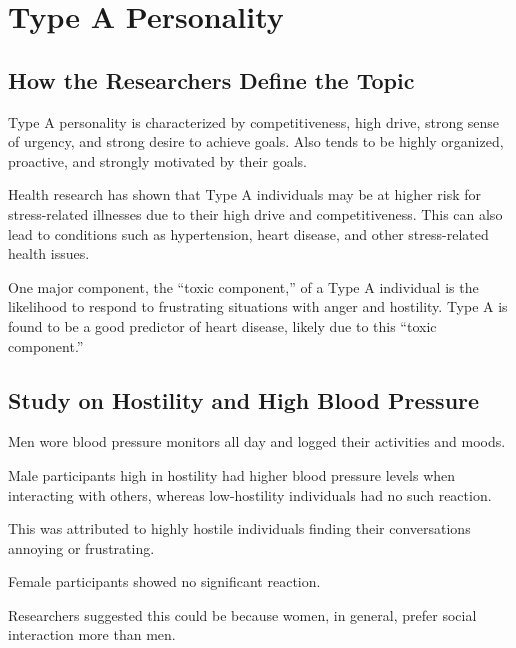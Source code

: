 \section{Type A Personality}  
\subsection{How the Researchers Define the Topic}  
\begin{coloredlist}  
    \item Type A personality is characterized by competitiveness, high drive, strong sense of urgency, and strong desire to achieve goals. Also tends to be highly organized, proactive, and strongly motivated by their goals.  
    \item Health research has shown that Type A individuals may be at higher risk for stress-related illnesses due to their high drive and competitiveness. This can also lead to conditions such as hypertension, heart disease, and other stress-related health issues.  
\end{coloredlist}  

One major component, the “toxic component,” of a Type A individual is the likelihood to respond to frustrating situations with anger and hostility. Type A is found to be a good predictor of heart disease, likely due to this “toxic component.”  

\subsection{Study on Hostility and High Blood Pressure}  
\begin{coloredlist}  
    \item Men wore blood pressure monitors all day and logged their activities and moods.  
    \item Male participants high in hostility had higher blood pressure levels when interacting with others, whereas low-hostility individuals had no such reaction.  
    \begin{coloredlist}  
        \item This was attributed to highly hostile individuals finding their conversations annoying or frustrating.  
    \end{coloredlist}  
    \item Female participants showed no significant reaction.  
    \begin{coloredlist}  
        \item Researchers suggested this could be because women, in general, prefer social interaction more than men.  
    \end{coloredlist}  
\end{coloredlist}  

